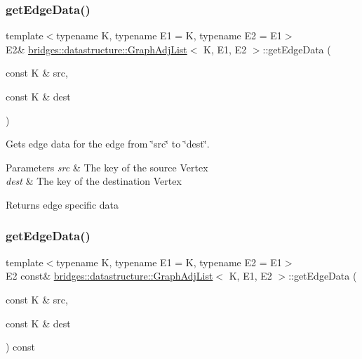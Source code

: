 \subsubsection{\texorpdfstring{get\+Edge\+Data()}{getEdgeData()}\hspace{0.1cm}{\footnotesize\ttfamily [1/2]}}
{\footnotesize\ttfamily template$<$typename K, typename E1 = K, typename E2 = E1$>$ \\
E2\& \hyperlink{classbridges_1_1datastructure_1_1_graph_adj_list}{bridges\+::datastructure\+::\+Graph\+Adj\+List}$<$ K, E1, E2 $>$\+::get\+Edge\+Data (\begin{DoxyParamCaption}\item[{const K \&}]{src,  }\item[{const K \&}]{dest }\end{DoxyParamCaption})\hspace{0.3cm}{\ttfamily [inline]}}



Gets edge data for the edge from \char`\"{}src\char`\"{} to \char`\"{}dest\char`\"{}. 


\begin{DoxyParams}{Parameters}
{\em src} & The key of the source Vertex \\
\hline
{\em dest} & The key of the destination Vertex\\
\hline
\end{DoxyParams}
\begin{DoxyReturn}{Returns}
edge specific data 
\end{DoxyReturn}
\mbox{\label{classbridges_1_1datastructure_1_1_graph_adj_list_a5c2cdffda7c983c3141ae36acc2b698d}} 
\subsubsection{\texorpdfstring{get\+Edge\+Data()}{getEdgeData()}\hspace{0.1cm}{\footnotesize\ttfamily [2/2]}}
{\footnotesize\ttfamily template$<$typename K, typename E1 = K, typename E2 = E1$>$ \\
E2 const\& \hyperlink{classbridges_1_1datastructure_1_1_graph_adj_list}{bridges\+::datastructure\+::\+Graph\+Adj\+List}$<$ K, E1, E2 $>$\+::get\+Edge\+Data (\begin{DoxyParamCaption}\item[{const K \&}]{src,  }\item[{const K \&}]{dest }\end{DoxyParamCaption}) const\hspace{0.3cm}{\ttfamily [inline]}}



